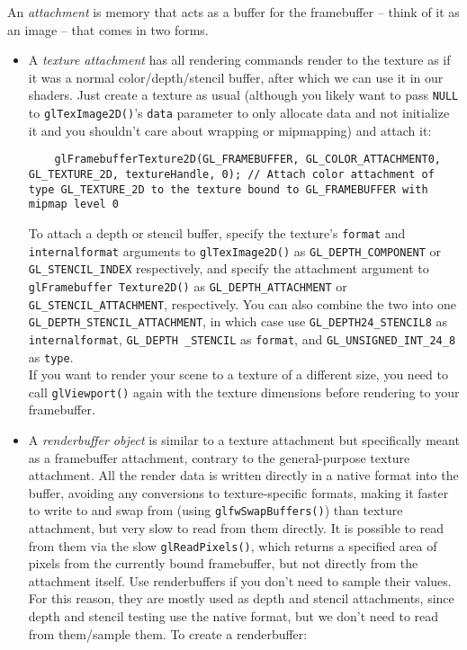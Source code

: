 \documentclass[8pt, table, xcdraw]{article}%
\begin{document}
An \emph{attachment} is memory that acts as a buffer for the framebuffer -- think of it as an image -- that comes in two forms.
\begin{itemize}
    \item A \emph{texture attachment} has all rendering commands render to the texture as if it was a normal color/depth/stencil buffer, after which we can use it in our shaders. Just create a texture as usual (although you likely want to pass \lstinline{NULL} to \lstinline{glTexImage2D()}'s \lstinline{data} parameter to only allocate data and not initialize it and you shouldn't care about wrapping or mipmapping) and attach it:

    \begin{lstlisting}
    glFramebufferTexture2D(GL_FRAMEBUFFER, GL_COLOR_ATTACHMENT0, GL_TEXTURE_2D, textureHandle, 0); // Attach color attachment of type GL_TEXTURE_2D to the texture bound to GL_FRAMEBUFFER with mipmap level 0
    \end{lstlisting}
    
    To attach a depth or stencil buffer, specify the texture's \lstinline{format} and \lstinline{internalformat} arguments to \lstinline{glTexImage2D()} as \lstinline{GL_DEPTH_COMPONENT} or \lstinline{GL_STENCIL_INDEX} respectively, and specify the attachment argument to \lstinline{glFramebuffer Texture2D()} as \lstinline{GL_DEPTH_ATTACHMENT} or \lstinline{GL_STENCIL_ATTACHMENT}, respectively. You can also combine the two into one \lstinline{GL_DEPTH_STENCIL_ATTACHMENT}, in which case use \lstinline{GL_DEPTH24_STENCIL8} as \lstinline{internalformat}, \lstinline{GL_DEPTH _STENCIL} as \lstinline{format}, and \lstinline{GL_UNSIGNED_INT_24_8} as \lstinline{type}.\\
    If you want to render your scene to a texture of a different size, you need to call \lstinline{glViewport()} again with the texture dimensions before rendering to your framebuffer.
    \item A \emph{renderbuffer object} is similar to a texture attachment but specifically meant as a framebuffer attachment, contrary to the general-purpose texture attachment. All the render data is written directly in a native format into the buffer, avoiding any conversions to texture-specific formats, making it faster to write to and swap from (using \lstinline{glfwSwapBuffers()}) than texture attachment, but very slow to read from them directly. It is possible to read from them via the slow \lstinline{glReadPixels()}, which returns a specified area of pixels from the currently bound framebuffer, but not directly from the attachment itself. Use renderbuffers if you don't need to sample their values. For this reason, they are mostly used as depth and stencil attachments, since depth and stencil testing use the native format, but we don't need to read from them/sample them. To create a renderbuffer:
    

\end{itemize}
\end{document}
